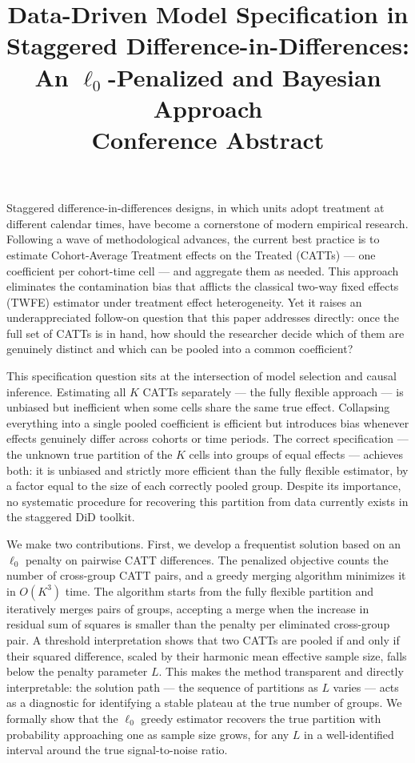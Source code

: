 \documentclass[12pt]{article}
\title{\textbf{Data-Driven Model Specification in Staggered
       Difference-in-Differences:\\
       An $\ell_0$-Penalized and Bayesian Approach}\\[6pt]
       \large Conference Abstract}
\author{}
\date{}
\begin{document}
\maketitle

\noindent
Staggered difference-in-differences designs, in which units adopt treatment
at different calendar times, have become a cornerstone of modern empirical
research. Following a wave of methodological advances, the current best
practice is to estimate Cohort-Average Treatment effects on the Treated
(CATTs) --- one coefficient per cohort-time cell --- and aggregate them as
needed. This approach eliminates the contamination bias that afflicts the
classical two-way fixed effects (TWFE) estimator under treatment effect
heterogeneity. Yet it raises an underappreciated follow-on question that
this paper addresses directly: once the full set of CATTs is in hand, how
should the researcher decide which of them are genuinely distinct and which
can be pooled into a common coefficient?

This specification question sits at the intersection of model selection and
causal inference. Estimating all $K$ CATTs separately --- the fully flexible
approach --- is unbiased but inefficient when some cells share the same true
effect. Collapsing everything into a single pooled coefficient is efficient
but introduces bias whenever effects genuinely differ across cohorts or time
periods. The correct specification --- the unknown true partition of the $K$
cells into groups of equal effects --- achieves both: it is unbiased and
strictly more efficient than the fully flexible estimator, by a factor equal
to the size of each correctly pooled group. Despite its importance,
no systematic procedure for recovering this partition from data currently
exists in the staggered DiD toolkit.

We make two contributions. First, we develop a frequentist solution based
on an $\ell_0$ penalty on pairwise CATT differences. The penalized objective
counts the number of cross-group CATT pairs, and a greedy merging algorithm
minimizes it in $O(K^3)$ time. The algorithm starts from the fully flexible
partition and iteratively merges pairs of groups, accepting a merge when the
increase in residual sum of squares is smaller than the penalty per
eliminated cross-group pair. A threshold interpretation shows that two CATTs
are pooled if and only if their squared difference, scaled by their harmonic
mean effective sample size, falls below the penalty parameter $L$. This
makes the method transparent and directly interpretable: the solution path
--- the sequence of partitions as $L$ varies --- acts as a diagnostic for
identifying a stable plateau at the true number of groups. We formally show
that the $\ell_0$ greedy estimator recovers the true partition with
probability approaching one as sample size grows, for any $L$ in a
well-identified interval around the true signal-to-noise ratio.
\end{document}
